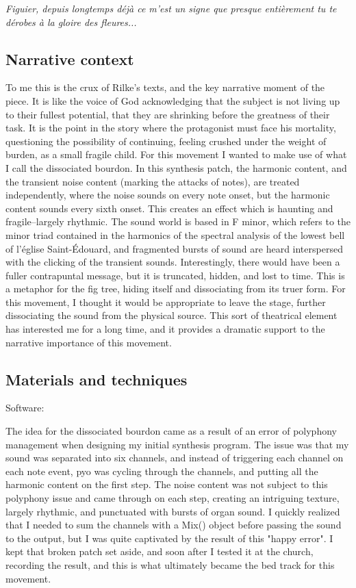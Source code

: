 \documentclass[12pt,twoside,maitrise]{dms_ks}
\theoremstyle{definition}
\begin{document}
{\epigraph{\textit{Figuier, depuis longtemps déjà ce m'est un signe que presque entièrement tu te dérobes à la gloire des fleures...}}{}

\subsection{Narrative context}

To me this is the crux of Rilke's texts, and the key narrative moment of the piece.
It is like the voice of God acknowledging that the subject is not living up to their fullest potential, that they are shrinking before the greatness of their task.
It is the point in the story where the protagonist must face his mortality, questioning the possibility of continuing, feeling crushed under the weight of burden, as a small fragile child.
For this movement I wanted to make use of what I call the dissociated bourdon.
In this synthesis patch, the harmonic content, and the transient noise content (marking the attacks of notes), are treated independently, where the noise sounds on every note onset, but the harmonic content sounds every sixth onset.
This creates an effect which is haunting and fragile--largely rhythmic.
The sound world is based in F minor, which refers to the minor triad contained in the harmonics of the spectral analysis of the lowest bell of l'église Saint-Édouard, and fragmented bursts of sound are heard interspersed with the clicking of the transient sounds.
Interestingly, there would have been a fuller contrapuntal message, but it is truncated, hidden, and lost to time.
This is a metaphor for the fig tree, hiding itself and dissociating from its truer form.
For this movement, I thought it would be appropriate to leave the stage, further dissociating the sound from the physical source.
This sort of theatrical element has interested me for a long time, and it provides a dramatic support to the narrative importance of this movement.

\subsection{Materials and techniques}

Software:

The idea for the dissociated bourdon came as a result of an error of polyphony management when designing my initial synthesis program.
The issue was that my sound was separated into six channels, and instead of triggering each channel on each note event, pyo was cycling through the channels, and putting all the harmonic content on the first step.
The noise content was not subject to this polyphony issue and came through on each step, creating an intriguing texture, largely rhythmic, and punctuated with bursts of organ sound.
I quickly realized that I needed to sum the channels with a Mix() object before passing the sound to the output, but I was quite captivated by the result of this "happy error".
I kept that broken patch set aside, and soon after I tested it at the church, recording the result, and this is what ultimately became the bed track for this movement.

}
\end{document}
